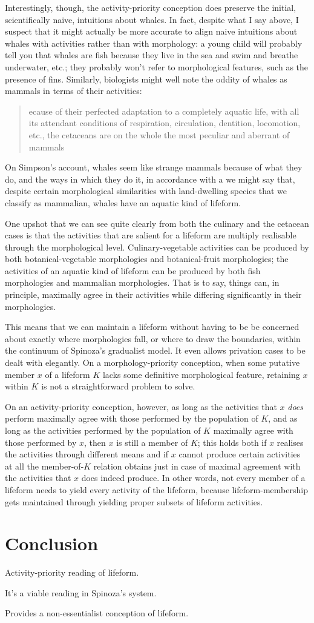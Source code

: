 \documentclass{article}
\newcommand{\dash}{\unskip{—}}
\begin{document}
Interestingly, though, the activity-priority conception does preserve the initial, scientifically naive, intuitions about whales. In fact, despite what I say above, I suspect that it might actually be more accurate to align naive intuitions about whales with activities rather than with morphology: a young child will probably tell you that whales are fish because they live in the sea and swim and breathe underwater, etc.; they probably won't refer to morphological features, such as the presence of fins. Similarly, biologists might well note the oddity of whales as mammals in terms of their activities:
{
  \blockcquote[213]{Simpson:1945}[.]{ecause of their perfected adaptation to a completely aquatic life, with all its attendant conditions of respiration, circulation, dentition, locomotion, etc., the cetaceans are on the whole the most peculiar and aberrant of mammals}
}
On Simpson's account, whales seem like strange mammals because of what they do, and the ways in which they do it, in accordance with a  \dash we might say that, despite certain morphological similarities with land-dwelling species that we classify as mammalian, whales have an aquatic kind of lifeform.

One upshot that we can see quite clearly from both the culinary and the cetacean cases is that the activities that are salient for a lifeform are multiply realisable through the morphological level. Culinary-vegetable activities can be produced by both botanical-vegetable morphologies and botanical-fruit morphologies; the activities of an aquatic kind of lifeform can be produced by both fish morphologies and mammalian morphologies. That is to say, things can, in principle, maximally agree in their activities while differing significantly in their morphologies.

This means that we can maintain a lifeform without having to be be concerned about exactly where morphologies fall, or where to draw the boundaries, within the continuum of Spinoza's gradualist model. It even allows privation cases to be dealt with elegantly. On a morphology-priority conception, when some putative member $x$ of a lifeform $K$ lacks some definitive morphological feature, retaining $x$ within $K$ is not a straightforward problem to solve.

On an activity-priority conception, however, as long as the activities that $x$ \emph{does} perform maximally agree with those performed by the population of $K$, and as long as the activities performed by the population of $K$ maximally agree with those performed by $x$, then $x$ is still a member of $K$; this holds both if $x$ realises the activities through different means and if $x$ cannot produce certain activities at all \dash the member-of-$K$ relation obtains just in case of maximal agreement with the activities that $x$ does indeed produce. In other words, not every member of a lifeform needs to yield every activity of the lifeform, because lifeform-membership gets maintained through yielding proper subsets of lifeform activities.

\section{Conclusion}\label{sec:Conclusion}
Activity-priority reading of lifeform.

It's a viable reading in Spinoza's system.

Provides a non-essentialist conception of lifeform.

\printbibliography
\end{document}
